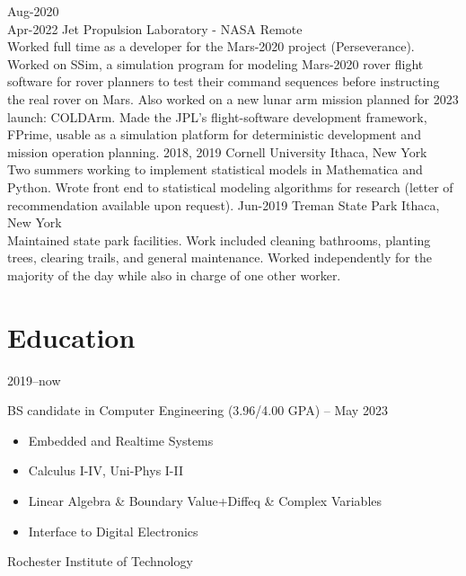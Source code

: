 \documentclass[print]{cv-style}          %
\begin{document}
\begin{entrylist}
\entry
  {Aug-2020\\Apr-2022}
  {Jet Propulsion Laboratory - NASA}
  {Remote}
  {\\
  Worked full time as a developer for the Mars-2020 project (Perseverance). Worked on SSim, a simulation program for modeling Mars-2020 rover flight software for rover planners to test their command sequences before instructing the real rover on Mars. Also worked on a new lunar arm mission planned for 2023 launch: COLDArm. Made the JPL's flight-software development framework, FPrime, usable as a simulation platform for deterministic development and mission operation planning.
  }
\entry
  {2018, 2019}
  {Cornell University}
  {Ithaca, New York}
  {\\
  Two summers working to implement statistical models in Mathematica and Python. Wrote front end to statistical modeling algorithms for research (letter of recommendation available upon request).}
  \entry
  {Jun-2019}
  {Treman State Park}
  {Ithaca, New York}
  {\\
Maintained state park facilities. Work included cleaning bathrooms, planting trees, clearing trails, and general maintenance. Worked independently for the majority of the day while also in charge of one other worker.}


\end{entrylist}


\section{Education}

\begin{entrylist}
{\vspace{-0.3cm}}
\entry
{2019--now}
{BS candidate {\normalfont in Computer Engineering (3.96/4.00 GPA) -- May 2023} \\
\begin{itemize}%
	\item Embedded and Realtime Systems
	\item Calculus I-IV, Uni-Phys I-II
	\item Linear Algebra \& Boundary Value+Diffeq \& Complex Variables
	\item Interface to Digital Electronics
\end{itemize}
}
{Rochester Institute of Technology}
{\vspace{-0.3cm}}

\end{entrylist}
\end{document}
